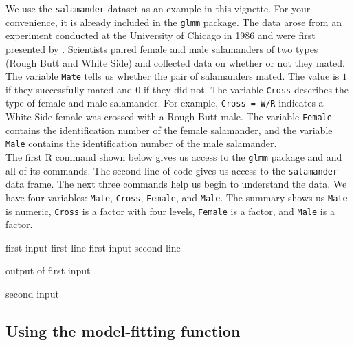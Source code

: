 \documentclass[article]{jss}
\begin{document}
We use the \texttt{salamander} dataset as an example in this vignette. For your convenience, it is already included in the \texttt{glmm} package. The data arose from an experiment conducted at the University of Chicago in 1986 and were first presented by \citet[section 14.5]{mcc:nelder:1989}. Scientists paired female and male salamanders of two types (Rough Butt and White Side) and collected data on whether or not they mated.  \\

The variable \texttt{Mate} tells us whether the pair of salamanders mated. The value is $1$ if they successfully mated and $0$ if they did not. The variable \texttt{Cross} describes the type of female and male salamander. For example, \texttt{Cross = W/R} indicates a White Side female was crossed with a Rough Butt male. The variable \texttt{Female} contains the identification number of the female salamander, and the variable \texttt{Male} contains the identification number of the male salamander.\\ 

The first R  command shown below gives us access to the \texttt{glmm} package and and all of its commands. The second line of code gives us access to the \texttt{salamander} data frame.  The next three commands help us begin to understand the data. We have four variables: \texttt{Mate}, \texttt{Cross}, \texttt{Female}, and \texttt{Male}. The summary shows us \texttt{Mate} is numeric, \texttt{Cross} is a factor with four levels, \texttt{Female} is a factor, and \texttt{Male} is a factor. 

\begin{CodeChunk}
\begin{CodeInput}
first input first line
first input second line
\end{CodeInput}
\begin{CodeOutput}
output of first input
\end{CodeOutput}
\begin{CodeInput}
second input
\end{CodeInput}
\end{CodeChunk}


\subsection{Using the model-fitting function}
\end{document}
